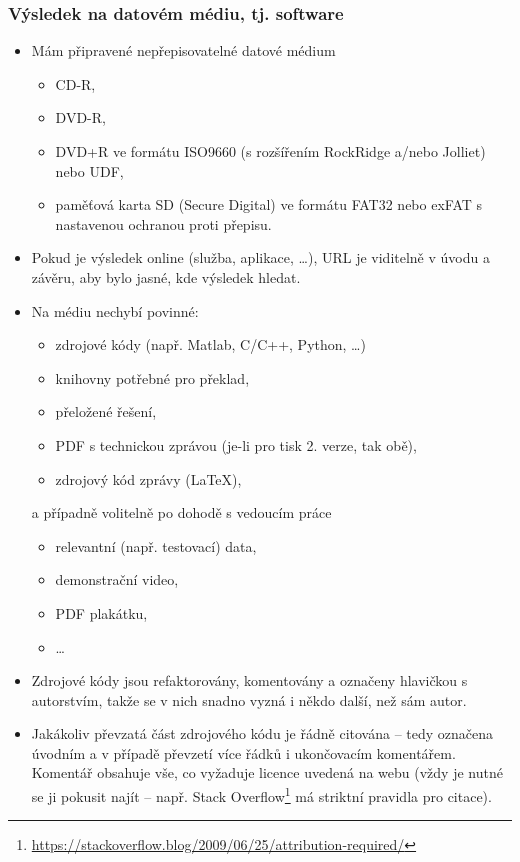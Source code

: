 \subsubsection*{Výsledek na datovém médiu, tj. software}
\begin{itemize}
	\item Mám připravené nepřepisovatelné datové médium 
      \begin{itemize}
	  		\item CD-R,
            \item DVD-R,
            \item DVD+R ve formátu ISO9660 (s rozšířením RockRidge a/nebo Jolliet) nebo UDF,
            \item paměťová karta SD (Secure Digital) ve formátu FAT32 nebo exFAT s nastavenou ochranou proti přepisu.
      \end{itemize}
	\item Pokud je výsledek online (služba, aplikace, \dots), URL je viditelně v úvodu a závěru, aby bylo jasné, kde výsledek hledat.
	\item Na médiu nechybí povinné: 
    	\begin{itemize}
    		\item zdrojové kódy (např. Matlab, C/C++, Python, \dots)
            \item knihovny potřebné pro překlad,
            \item přeložené řešení,
            \item PDF s technickou zprávou (je-li pro tisk 2. verze, tak obě),
            \item zdrojový kód zprávy (\LaTeX), 
    	\end{itemize}
        a případně volitelně po dohodě s vedoucím práce
		\begin{itemize}
			\item relevantní (např. testovací) data, 
            \item demonstrační video,
            \item PDF plakátku,
            \item \dots
		\end{itemize}        
	\item Zdrojové kódy jsou refaktorovány, komentovány a označeny hlavičkou s autorstvím, takže se v nich snadno vyzná i někdo další, než sám autor.
    \item Jakákoliv převzatá část zdrojového kódu je řádně citována -- tedy označena úvodním a v případě převzetí více řádků i ukončovacím komentářem. Komentář obsahuje vše, co vyžaduje licence uvedená na webu (vždy je nutné se ji pokusit najít -- např. Stack Overflow\footnote{\url{https://stackoverflow.blog/2009/06/25/attribution-required/}} má striktní pravidla pro citace).
\end{itemize}

